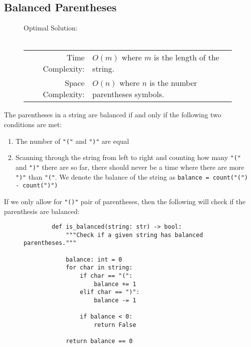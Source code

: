 
\subsection{Balanced Parentheses}

\begin{figure}[H]
    Optimal Solution:\\\\
    \begin{tabular}{rl}
        Time Complexity:& \(O(m)\) where \(m\) is the length of the string.\\
        Space Complexity:& \(O(n)\) where \(n\) is the number parentheses
        symbols.
    \end{tabular}
\end{figure}

The parentheses in a string are balanced if and only if the following two
conditions are met:

\begin{enumerate}
    \item The number of \texttt{"("} and \texttt{")"}
          are equal
    \item Scanning through the string from left to right and counting how many
          \texttt{"("} and \texttt{")"} there are so
          far, there should never be a time where there are more
          \texttt{")"} than \texttt{"("}. We denote the
          balance of the string as
          \texttt{balance = count("(") - count(")")}
\end{enumerate}

If we only allow for \texttt{"()"} pair of parentheses, then the
following will check if the parenthesis are balanced:

\begin{figure}[H]
    \centering
    \begin{verbatim}
        def is_balanced(string: str) -> bool:
            """Check if a given string has balanced parentheses."""

            balance: int = 0
            for char in string:
                if char == "(":
                    balance += 1
                elif char == ")":
                    balance -= 1

                if balance < 0:
                    return False

            return balance == 0
    \end{verbatim}
\end{figure}

